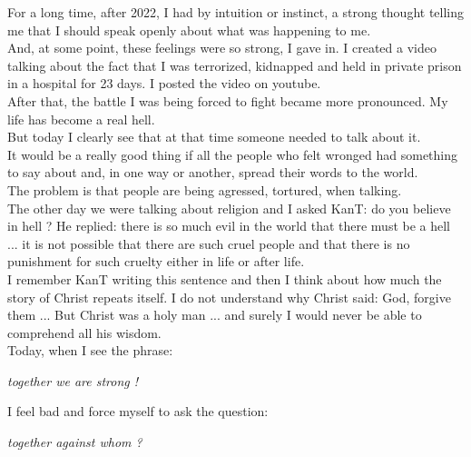 \documentclass[11pt]{book}
\begin{document}
\noindent For a long time, after 2022, I had by intuition or instinct, a strong thought telling me that I should speak openly about what was happening to me. \\

\noindent And, at some point, these feelings were so strong, I gave in. I created a video talking about the fact that I was terrorized, kidnapped and held in private prison in a hospital for 23 days. I posted the video on youtube. \\

\noindent After that, the battle I was being forced to fight became more pronounced. My life has become a real hell. \\

\noindent But today I clearly see that at that time someone needed to talk about it. \\

\noindent It would be a really good thing if all the people who felt wronged had something to say about and, in one way or another, spread their words to the world. \\

\noindent The problem is that people are being agressed, tortured, when talking. \\

\noindent The other day we were talking about religion and I asked KanT: do you believe in hell ? He replied: there is so much evil in the world that there must be a hell ... it is not possible that there are such cruel people and that there is no punishment for such cruelty either in life or after life. \\

\noindent I remember KanT writing this sentence and then I think about how much the story of Christ repeats itself. I do not understand why Christ said: God, forgive them ... But Christ was a holy man ... and surely I would never be able to comprehend all his wisdom. \\

\noindent Today, when I see the phrase:

\noindent \begin{center} \emph{together we are strong !} \end{center}

\noindent I feel bad and force myself to ask the question:

\noindent \begin{center} \emph{together against whom ?} \end{center}
\end{document}
